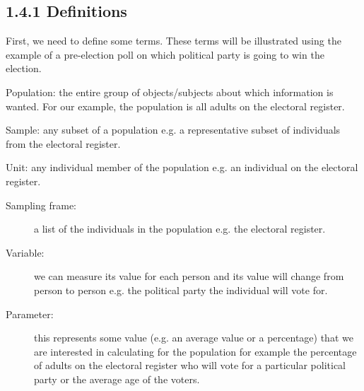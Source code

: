 
\subsection{1.4.1 Definitions}

First, we need to define some terms. These terms will be illustrated using the example of a pre-election poll on which political party is going to win the election.

Population: the entire group of objects/subjects about which information is wanted. For our example, the population is all adults on the electoral register.

Sample: any subset of a population e.g. a representative subset of individuals from the electoral register.

Unit: any individual member of the population e.g. an individual on the electoral register.



\begin{description}
\item[Sampling frame:] a list of the individuals in the population e.g. the electoral register.

\item[Variable:] we can measure its value for each person and its value will change from person to person e.g. the political party the individual will vote for.

\item[Parameter:] this represents some value (e.g. an average value or a percentage) that we are interested in calculating for the population for example the percentage of adults on the electoral register who will vote for a particular political party or the average age of the voters. 
\end{description}



